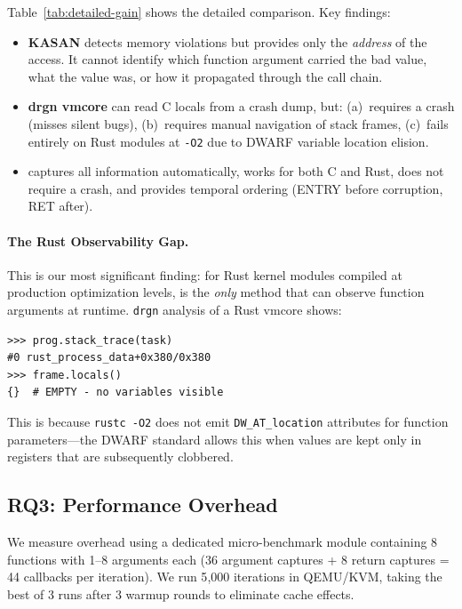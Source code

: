 \documentclass{ndss}
\begin{document}
Table~\ref{tab:detailed-gain} shows the detailed comparison. Key findings:

\begin{itemize}[nosep]
  \item \textbf{KASAN} detects memory violations but provides only the
        \emph{address} of the access. It cannot identify which function
        argument carried the bad value, what the value was, or how it
        propagated through the call chain.
  \item \textbf{drgn vmcore} can read C locals from a crash dump, but:
        (a)~requires a crash (misses silent bugs), (b)~requires manual
        navigation of stack frames, (c)~fails entirely on Rust modules at
        \texttt{-O2} due to DWARF variable location elision.
  \item \textbf{\toolname{}} captures all information automatically, works for
        both C and Rust, does not require a crash, and provides temporal
        ordering (ENTRY before corruption, RET after).
\end{itemize}

\paragraph{The Rust Observability Gap.} This is our most significant finding:
for Rust kernel modules compiled at production optimization levels, \toolname{}
is the \emph{only} method that can observe function arguments at runtime.
\texttt{drgn} analysis of a Rust vmcore shows:
\begin{lstlisting}[numbers=none]
>>> prog.stack_trace(task)
#0 rust_process_data+0x380/0x380
>>> frame.locals()
{}  # EMPTY - no variables visible
\end{lstlisting}

This is because \texttt{rustc -O2} does not emit \texttt{DW\_AT\_location}
attributes for function parameters---the DWARF standard allows this when
values are kept only in registers that are subsequently clobbered.

\subsection{RQ3: Performance Overhead}\label{sec:rq3}

We measure overhead using a dedicated micro-benchmark module containing 8
functions with 1--8 arguments each (36 argument captures + 8 return captures =
44 callbacks per iteration). We run 5{,}000 iterations in QEMU/KVM, taking the
best of 3 runs after 3 warmup rounds to eliminate cache effects.
\end{document}
